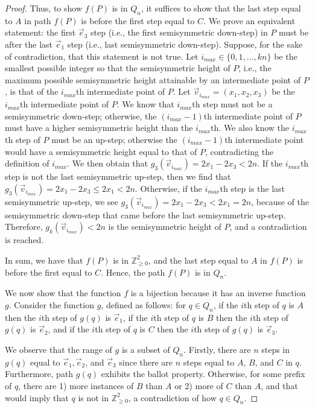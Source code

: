 \documentclass[10pt,a4paper]{amsart}
\begin{document}
\begin{proof}
    
    Thus, to show $f(P)$ is in $Q_n$, it suffices to show that the last step equal to $A$ in path $f(P)$ is before the first step equal to $C$. We prove an equivalent statement: the first $\vec{e}_3$ step (i.e., the first semisymmetric down-step) in $P$ must be after the last $\vec{e}_1$ step (i.e., last semisymmetric down-step). Suppose, for the sake of contradiction, that this statement is not true. Let $i_{max} \in \{0, 1, \dots, kn\}$ be the smallest possible integer so that the semisymmetric height of $P$, i.e., the maximum possible semisymmetric height attainable by an intermediate point of $P$, is that of the $i_{max}$th intermediate point of $P$. Let $\vec{v}_{i_{max}}=(x_1, x_2, x_3)$ be the $i_{max}$th intermediate point of $P$. We know that $i_{max}$th step must not be a semisymmetric down-step; otherwise, the $(i_{max}-1)$th intermediate point of $P$ must have a higher semisymmetric height than the $i_{max}$th. We also know the $i_{max}$th step of $P$ must be an up-step; otherwise the $(i_{max}-1)$th intermediate point would have a semisymmetric height equal to that of $P$, contradicting the definition of $i_{max}$. We then obtain that $g_3(\vec{v}_{i_{max}})=2x_1-2x_3 < 2n$. If the $i_{max}$th step is not the last semisymmetric up-step, then we find that $g_3(\vec{v}_{i_{max}})=2x_1-2x_3 \leq 2x_1 < 2n$. Otherwise, if the $i_{max}$th step is the last semisymmetric up-step, we see $g_3(\vec{v}_{i_{max}})=2x_1-2x_3 < 2x_1 = 2n$, because of the semisymmetric down-step that came before the last semisymmetric up-step. Therefore, $g_k(\vec{v}_{i_{max}}) < 2n$ is the semisymmetric height of $P$, and a contradiction is reached. 

    In sum, we have that $f(P)$ is in $\mathbb{Z}_{\geq 0}^2$, and the last step equal to $A$ in $f(P)$ is before the first equal to $C$.  Hence, the path $f(P)$ is in $Q_n$.
    
    We now show that the function $f$ is a bijection because it has an inverse function $g$. Consider the function $g$, defined as follows: for $q \in Q_n$, if the $i$th step of $q$ is $A$ then the $i$th step of $g(q)$ is $\vec{e}_1$, if the $i$th step of $q$ is $B$ then the $i$th step of $g(q)$ is $\vec{e}_2$, and if the $i$th step of $q$ is $C$ then the $i$th step of $g(q)$ is $\vec{e}_3$. 
    
    We observe that the range of $g$ is a subset of $Q_n$. Firstly, there are $n$ steps in $g(q)$ equal to $\vec{e}_1, \vec{e}_2$, and $\vec{e}_3$ since there are $n$ steps equal to $A$, $B$, and $C$ in $q$. Furthermore, path $g(q)$ exhibits the ballot property. Otherwise, for some prefix of $q$, there are 1) more instances of $B$  than $A$ or 2) more of $C$ than $A$, and that would imply that $q$ is not in $\mathbb{Z}_{\geq 0}^2$, a contradiction of how $q \in Q_n$.
    

\end{proof}
\end{document}
